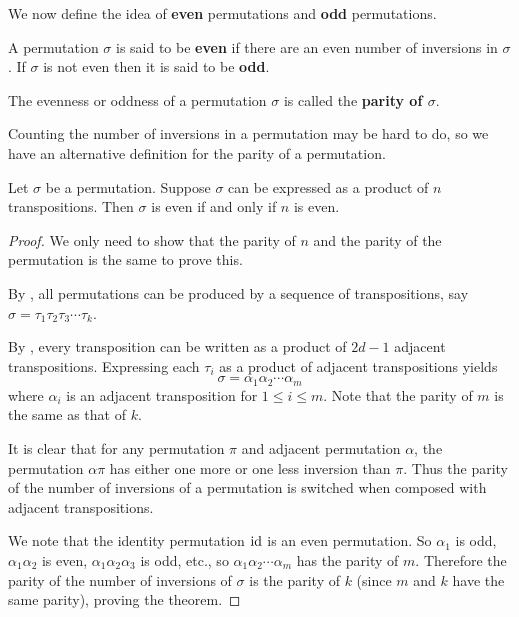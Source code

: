 We now define the idea of \textbf{even} permutations and \textbf{odd} permutations.
\begin{definition}
    A permutation $\sigma$ is said to be \textbf{even} if there are an even number of inversions in $\sigma$. If $\sigma$ is not even then it is said to be \textbf{odd}.
\end{definition}
The evenness or oddness of a permutation $\sigma$ is called the \textbf{parity of $\sigma$}.

Counting the number of inversions in a permutation may be hard to do, so we have an alternative definition for the parity of a permutation.

\begin{theorem}\label{thrm-parity-of-permutation}
    Let $\sigma$ be a permutation. Suppose $\sigma$ can be expressed as a product of $n$ transpositions. Then $\sigma$ is even if and only if $n$ is even.
\end{theorem}
\begin{proof}
    We only need to show that the parity of $n$ and the parity of the permutation is the same to prove this.

    By , all permutations can be produced by a sequence of transpositions, say $\sigma = \tau_1\tau_2\tau_3\cdots\tau_k$.

    By , every transposition can be written as a product of $2d - 1$ adjacent transpositions. Expressing each $\tau_i$ as a product of adjacent transpositions yields
    \[
        \sigma = \alpha_1\alpha_2\cdots\alpha_m
    \]
    where $\alpha_i$ is an adjacent transposition for $1 \leq i \leq m$. Note that the parity of $m$ is the same as that of $k$.

    It is clear that for any permutation $\pi$ and adjacent permutation $\alpha$, the permutation $\alpha\pi$ has either one more or one less inversion than $\pi$. Thus the parity of the number of inversions of a permutation is switched when composed with adjacent transpositions.

    We note that the identity permutation $\mathrm{id}$ is an even permutation. So $\alpha_1$ is odd, $\alpha_1\alpha_2$ is even, $\alpha_1\alpha_2\alpha_3$ is odd, etc., so $\alpha_1\alpha_2\cdots\alpha_m$ has the parity of $m$. Therefore the parity of the number of inversions of $\sigma$ is the parity of $k$ (since $m$ and $k$ have the same parity), proving the theorem.
\end{proof}

